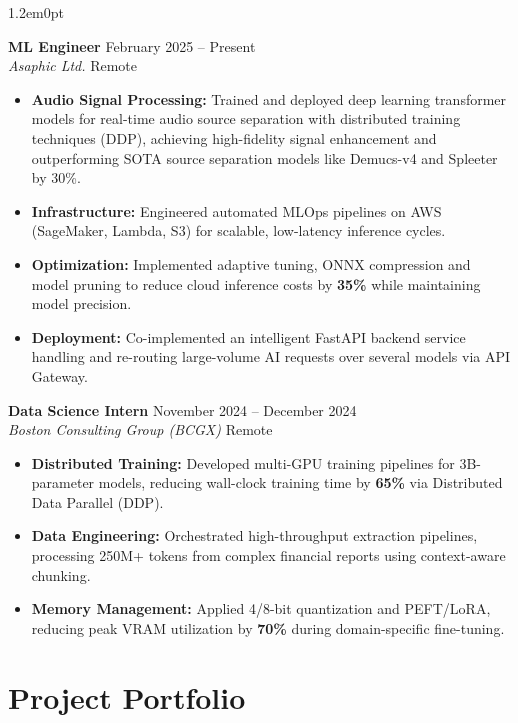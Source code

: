 \documentclass[a4paper,9pt]{extarticle}
\newenvironment{subs}
  {\begin{adjustwidth}{1.2em}{0pt}}
  {\end{adjustwidth}}
\newcommand{\entryheader}[4]{
    \noindent\textbf{#1} \hfill #2 \\
    \textit{#3} \hfill \small #4
}
\begin{document}
\begin{subs}
    \entryheader{ML Engineer}{February 2025 -- Present}{Asaphic Ltd.}{Remote}
    \begin{itemize}
        \item \textbf{Audio Signal Processing:} Trained and deployed deep learning transformer models for real-time audio source separation with distributed training techniques (DDP), achieving high-fidelity signal enhancement and outperforming SOTA source separation models like Demucs-v4 and Spleeter by 30\%.
        \item \textbf{Infrastructure:} Engineered automated MLOps pipelines on AWS (SageMaker, Lambda, S3) for scalable, low-latency inference cycles.
        \item \textbf{Optimization:} Implemented adaptive tuning, ONNX compression and model pruning to reduce cloud inference costs by \textbf{35\%} while maintaining model precision.
        \item \textbf{Deployment:} Co-implemented an intelligent FastAPI backend service handling and re-routing large-volume AI requests over several models via API Gateway.
    \end{itemize}

    \vspace{6pt}

    \entryheader{Data Science Intern}{November 2024 -- December 2024}{Boston Consulting Group (BCGX)}{Remote}
    \begin{itemize}
        \item \textbf{Distributed Training:} Developed multi-GPU training pipelines for 3B-parameter models, reducing wall-clock training time by \textbf{65\%} via Distributed Data Parallel (DDP).
        \item \textbf{Data Engineering:} Orchestrated high-throughput extraction pipelines, processing 250M+ tokens from complex financial reports using context-aware chunking.
        \item \textbf{Memory Management:} Applied 4/8-bit quantization and PEFT/LoRA, reducing peak VRAM utilization by \textbf{70\%} during domain-specific fine-tuning.
    \end{itemize}
\end{subs}

\section*{Project Portfolio}
\end{document}
